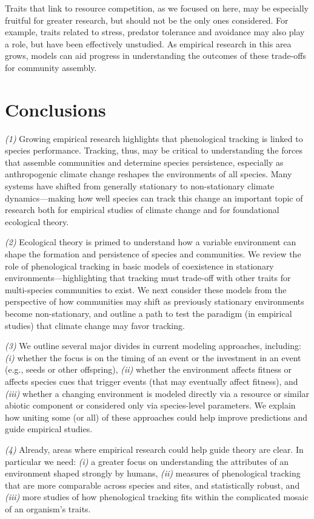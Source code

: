 \documentclass[11pt,letterpaper]{article}
\begin{document}
Traits that link to resource competition, as we focused on here, may be especially fruitful for greater research, but should not be the only ones considered. For example, traits related to stress, predator tolerance and avoidance may also play a role, but have been effectively unstudied.  As empirical research in this area grows, models can aid progress in understanding the outcomes of these trade-offs for community assembly.  

\section{Conclusions}
\emph{(1)} Growing empirical research highlights that phenological tracking is linked to species performance. Tracking, thus, may be critical to understanding the forces that assemble communities and determine species persistence, especially as anthropogenic climate change reshapes the environments of all species. Many systems have shifted from generally stationary to non-stationary climate dynamics---making how well species can track this change an important topic of research both for empirical studies of climate change and for foundational ecological theory. 

\emph{(2)} Ecological theory is primed to understand how a variable environment can shape the formation and persistence of species and communities.  We review the role of phenological tracking in basic models of coexistence in stationary environments---highlighting that tracking must trade-off with other traits for multi-species communities to exist. We next consider these models from the perspective of how communities may shift as previously stationary environments become non-stationary, and outline a path to test the paradigm (in empirical studies) that climate change may favor tracking.

\emph{(3)}  We outline several major divides in current modeling approaches, including: \emph{(i)} whether the focus is on the timing of an event or the investment in an event (e.g., seeds or other offspring), \emph{(ii)} whether the environment affects fitness or affects species cues that trigger events (that may eventually affect fitness), and \emph{(iii)} whether a changing environment is modeled directly via a resource or similar abiotic component or considered only via species-level parameters. We explain how uniting some (or all) of these approaches could help improve predictions and guide empirical studies. 

\emph{(4)} Already, areas where empirical research could help guide theory are clear. In particular we need: \emph{(i)} a greater focus on understanding the attributes of an environment shaped strongly by humans, \emph{(ii)} measures of phenological tracking that are more comparable across species and sites, and statistically robust, and \emph{(iii)} more studies of how phenological tracking fits within the complicated mosaic of an organism's traits.
\end{document}
